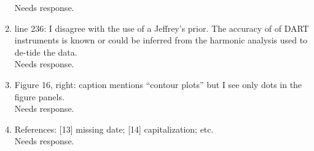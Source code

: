 \documentclass[]{article}
\newcommand{\alert}[1]{{\color{red} #1}}
\begin{document}
\begin{enumerate}
\alert{Needs response.} \\

\item line 236: I disagree with the use of a Jeffrey's prior. The accuracy of of DART instruments is known or could be inferred from the harmonic analysis used to de-tide the data.\\

\alert{Needs response.} \\

\item Figure 16, right: caption mentions ``contour plots'' but I see only dots in the figure panels.\\

\alert{Needs response.} \\

\item References: [13] missing date; [14] capitalization; etc.\\

\alert{Needs response.} \\

\end{enumerate}





\end{document}
